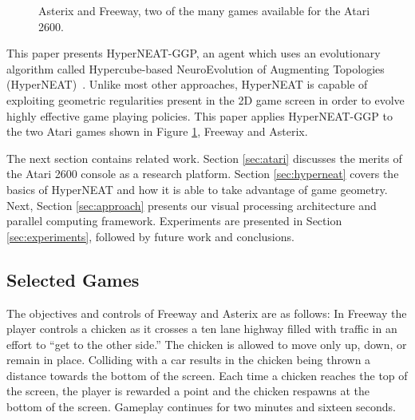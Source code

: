 \documentclass{sig-alternate}
\begin{document}
\begin{figure}[t]
  \centering
  \hspace{.1in}
  \hspace{.1in}
 \caption{Asterix and Freeway, two of the many games available for the Atari 2600.}
 \label{fig:samplegames}
\end{figure}

This paper presents HyperNEAT-GGP, an agent which uses an evolutionary algorithm called Hypercube-based NeuroEvolution of Augmenting Topologies (HyperNEAT)~\cite{gauci08}. Unlike most other approaches, HyperNEAT is capable of exploiting geometric regularities present in the 2D game screen in order to evolve highly effective game playing policies. This paper applies HyperNEAT-GGP to the two Atari games shown in Figure \ref{fig:samplegames}, Freeway and Asterix.

The next section contains related work. Section \ref{sec:atari} discusses the merits of the Atari 2600 console as a research platform. Section \ref{sec:hyperneat} covers the basics of HyperNEAT and how it is able to take advantage of game geometry. Next, Section \ref{sec:approach} presents our visual processing architecture and parallel computing framework. Experiments are presented in Section \ref{sec:experiments}, followed by future work and conclusions.

\subsection{Selected Games}
The objectives and controls of Freeway and Asterix are as follows: In Freeway the player controls a chicken as it crosses a ten lane highway filled with traffic in an effort to ``get to the other side.'' The chicken is allowed to move only up, down, or remain in place. Colliding with a car results in the chicken being thrown a distance towards the bottom of the screen. Each time a chicken reaches the top of the screen, the player is rewarded a point and the chicken respawns at the bottom of the screen. Gameplay continues for two minutes and sixteen seconds. 
\end{document}
